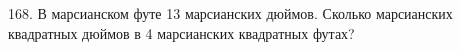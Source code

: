168. В марсианском футе 13 марсианских дюймов. Сколько марсианских квадратных дюймов в 4 марсианских квадратных футах?\\
